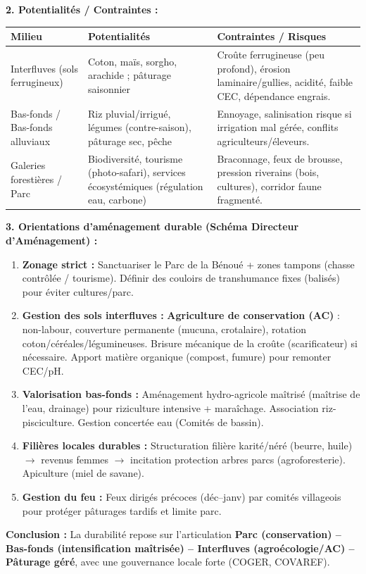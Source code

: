 \documentclass[11pt]{article}
\begin{document}
\begin{exoresolu}
\textbf{2. Potentialités / Contraintes :}
\begin{center}
\begin{tabularx}{\linewidth}{|l|X|X|}\hline
\textbf{Milieu} & \textbf{Potentialités} & \textbf{Contraintes / Risques} \\ \hline
Interfluves (sols ferrugineux) & Coton, maïs, sorgho, arachide ; pâturage saisonnier & Croûte ferrugineuse (peu profond), érosion laminaire/gullies, acidité, faible CEC, dépendance engrais. \\ \hline
Bas-fonds / Bas-fonds alluviaux & Riz pluvial/irrigué, légumes (contre-saison), pâturage sec, pêche & Ennoyage, salinisation risque si irrigation mal gérée, conflits agriculteurs/éleveurs. \\ \hline
Galeries forestières / Parc & Biodiversité, tourisme (photo-safari), services écosystémiques (régulation eau, carbone) & Braconnage, feux de brousse, pression riverains (bois, cultures), corridor faune fragmenté. \\ \hline
\end{tabularx}
\end{center}

\textbf{3. Orientations d'aménagement durable (Schéma Directeur d'Aménagement) :}
\begin{enumerate}
    \item \textbf{Zonage strict :} Sanctuariser le Parc de la Bénoué + zones tampons (chasse contrôlée / tourisme). Définir des couloirs de transhumance fixes (balisés) pour éviter cultures/parc.
    \item \textbf{Gestion des sols interfluves :} \textbf{Agriculture de conservation (AC)} : non-labour, couverture permanente (mucuna, crotalaire), rotation coton/céréales/légumineuses. Brisure mécanique de la croûte (scarificateur) si nécessaire. Apport matière organique (compost, fumure) pour remonter CEC/pH.
    \item \textbf{Valorisation bas-fonds :} Aménagement hydro-agricole maîtrisé (maîtrise de l'eau, drainage) pour riziculture intensive + maraîchage. Association riz-pisciculture. Gestion concertée eau (Comités de bassin).
    \item \textbf{Filières locales durables :} Structuration filière karité/néré (beurre, huile) $\rightarrow$ revenus femmes $\rightarrow$ incitation protection arbres parcs (agroforesterie). Apiculture (miel de savane).
    \item \textbf{Gestion du feu :} Feux dirigés précoces (déc--janv) par comités villageois pour protéger pâturages tardifs et limite parc.
\end{enumerate}
\textbf{Conclusion :} La durabilité repose sur l'articulation \textbf{Parc (conservation) -- Bas-fonds (intensification maîtrisée) -- Interfluves (agroécologie/AC) -- Pâturage géré}, avec une gouvernance locale forte (COGER, COVAREF).
\end{exoresolu}
\end{document}
